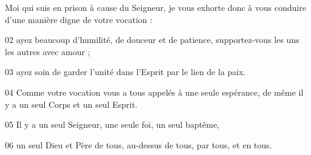 Moi qui suis en prison à cause du Seigneur, je vous exhorte donc à vous conduire d’une manière digne de votre vocation :

02 ayez beaucoup d’humilité, de douceur et de patience, supportez-vous les uns les autres avec amour ;

03 ayez soin de garder l’unité dans l’Esprit par le lien de la paix.

04 Comme votre vocation vous a tous appelés à une seule espérance, de même il y a un seul Corps et un seul Esprit.

05 Il y a un seul Seigneur, une seule foi, un seul baptême,

06 un seul Dieu et Père de tous, au-dessus de tous, par tous, et en tous.
